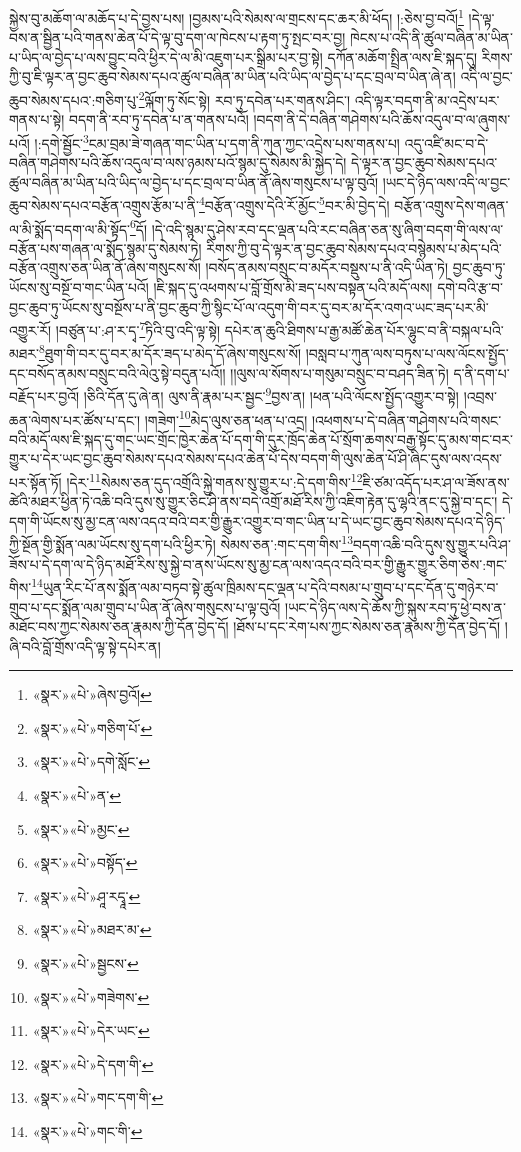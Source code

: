 སྐྱེས་བུ་མཆོག་ལ་མཆོད་པ་དེ་བྱས་པས། །བྱམས་པའི་སེམས་ལ་གྲངས་དང་ཆར་མི་ཕོད། །:ཅེས་བྱ་བའོ།\footnote{«སྣར་»«པེ་»ཞེས་བྱའོ།} །དེ་ལྟ་བས་ན་སྦྱིན་པའི་གནས་ཆེན་པོ་དེ་ལྟ་བུ་དག་ལ་ཁེངས་པ་རྟག་ཏུ་སྤང་བར་བྱ། ཁེངས་པ་འདི་ནི་ཚུལ་བཞིན་མ་ཡིན་པ་ཡིད་ལ་བྱེད་པ་ལས་བྱུང་བའི་ཕྱིར་དེ་ལ་མི་འཇུག་པར་སྒྲིམ་པར་བྱ་སྟེ། དཀོན་མཆོག་སྤྲིན་ལས་ཇི་སྐད་དུ། རིགས་ཀྱི་བུ་ཇི་ལྟར་ན་བྱང་ཆུབ་སེམས་དཔའ་ཚུལ་བཞིན་མ་ཡིན་པའི་ཡིད་ལ་བྱེད་པ་དང་བྲལ་བ་ཡིན་ཞེ་ན། འདི་ལ་བྱང་ཆུབ་སེམས་དཔའ་:གཅིག་པུ་\footnote{«སྣར་»«པེ་»གཅིག་པོ་}ལྐོག་ཏུ་སོང་སྟེ། རབ་ཏུ་དབེན་པར་གནས་ཤིང་། འདི་ལྟར་བདག་ནི་མ་འདྲེས་པར་གནས་པ་སྟེ། བདག་ནི་རབ་ཏུ་དབེན་པ་ན་གནས་པའོ། །བདག་ནི་དེ་བཞིན་གཤེགས་པའི་ཆོས་འདུལ་བ་ལ་ཞུགས་པའོ། །:དགེ་སྦྱོང་\footnote{«སྣར་»«པེ་»དགེ་སློང་}ངམ་བྲམ་ཟེ་གཞན་གང་ཡིན་པ་དག་ནི་ཀུན་ཀྱང་འདྲེས་པས་གནས་པ། འདུ་འཛི་མང་བ་དེ་བཞིན་གཤེགས་པའི་ཆོས་འདུལ་བ་ལས་ཉམས་པའོ་སྙམ་དུ་སེམས་མི་སྐྱེད་དེ། དེ་ལྟར་ན་བྱང་ཆུབ་སེམས་དཔའ་ཚུལ་བཞིན་མ་ཡིན་པའི་ཡིད་ལ་བྱེད་པ་དང་བྲལ་བ་ཡིན་ནོ་ཞེས་གསུངས་པ་ལྟ་བུའོ། །ཡང་དེ་ཉིད་ལས་འདི་ལ་བྱང་ཆུབ་སེམས་དཔའ་བརྩོན་འགྲུས་རྩོམ་པ་ནི་\footnote{«སྣར་»«པེ་»ན་}བརྩོན་འགྲུས་དེའི་རོ་མྱོང་\footnote{«སྣར་»«པེ་»མྱང་}བར་མི་བྱེད་དེ། བརྩོན་འགྲུས་དེས་གཞན་ལ་མི་སྨོད་བདག་ལ་མི་སྟོད་\footnote{«སྣར་»«པེ་»བསྟོད་}དོ། །དེ་འདི་སྙམ་དུ་ཤེས་རབ་དང་ལྡན་པའི་རང་བཞིན་ཅན་སུ་ཞིག་བདག་གི་ལས་ལ་བརྩོན་པས་གཞན་ལ་སྨོད་སྙམ་དུ་སེམས་ཏེ། རིགས་ཀྱི་བུ་དེ་ལྟར་ན་བྱང་ཆུབ་སེམས་དཔའ་བསྙེམས་པ་མེད་པའི་བརྩོན་འགྲུས་ཅན་ཡིན་ནོ་ཞེས་གསུངས་སོ། །བསོད་ནམས་བསྲུང་བ་མདོར་བསྡུས་པ་ནི་འདི་ཡིན་ཏེ། བྱང་ཆུབ་ཏུ་ཡོངས་སུ་བསྔོ་བ་གང་ཡིན་པའོ། །ཇི་སྐད་དུ་འཕགས་པ་བློ་གྲོས་མི་ཟད་པས་བསྟན་པའི་མདོ་ལས། དགེ་བའི་རྩ་བ་བྱང་ཆུབ་ཏུ་ཡོངས་སུ་བསྔོས་པ་ནི་བྱང་ཆུབ་ཀྱི་སྙིང་པོ་ལ་འདུག་གི་བར་དུ་བར་མ་དོར་འགའ་ཡང་ཟད་པར་མི་འགྱུར་རོ། །བཙུན་པ་:ཤ་ར་དྭ་\footnote{«སྣར་»«པེ་»ཤཱ་རདྭཱ་}ཏིའི་བུ་འདི་ལྟ་སྟེ། དཔེར་ན་ཆུའི་ཐིགས་པ་རྒྱ་མཚོ་ཆེན་པོར་ལྷུང་བ་ནི་བསྐལ་པའི་མཐར་\footnote{«སྣར་»«པེ་»མཐར་མ་}ཐུག་གི་བར་དུ་བར་མ་དོར་ཟད་པ་མེད་དོ་ཞེས་གསུངས་སོ། །བསླབ་པ་ཀུན་ལས་བཏུས་པ་ལས་ལོངས་སྤྱོད་དང་བསོད་ནམས་བསྲུང་བའི་ལེའུ་སྟེ་བདུན་པའོ།། །།ལུས་ལ་སོགས་པ་གསུམ་བསྲུང་བ་བཤད་ཟིན་ཏེ། ད་ནི་དག་པ་བརྗོད་པར་བྱའོ། །ཅིའི་དོན་དུ་ཞེ་ན། ལུས་ནི་རྣམ་པར་སྦྱང་\footnote{«སྣར་»«པེ་»སྦྱངས་}བྱས་ན། །ཕན་པའི་ལོངས་སྤྱོད་འགྱུར་བ་སྟེ། །འབྲས་ཆན་ལེགས་པར་ཚོས་པ་དང་། །གཟེག་\footnote{«སྣར་»«པེ་»གཟེགས་}མེད་ལུས་ཅན་ཕན་པ་འདྲ། །འཕགས་པ་དེ་བཞིན་གཤེགས་པའི་གསང་བའི་མདོ་ལས་ཇི་སྐད་དུ་གང་ཡང་གྲོང་ཁྱེར་ཆེན་པོ་དག་གི་དུར་ཁྲོད་ཆེན་པོ་སྲོག་ཆགས་བརྒྱ་སྟོང་དུ་མས་གང་བར་གྱུར་པ་དེར་ཡང་བྱང་ཆུབ་སེམས་དཔའ་སེམས་དཔའ་ཆེན་པོ་དེས་བདག་གི་ལུས་ཆེན་པོ་ཤི་ཞིང་དུས་ལས་འདས་པར་སྟོན་ཏོ། །དེར་\footnote{«སྣར་»«པེ་»དེར་ཡང་}སེམས་ཅན་དུད་འགྲོའི་སྐྱེ་གནས་སུ་གྱུར་པ་:དེ་དག་གིས་\footnote{«སྣར་»«པེ་»དེ་དག་གི་}ཇི་ཙམ་འདོད་པར་ཤ་ལ་ཟོས་ནས་ཚེའི་མཐར་ཕྱིན་ཏེ་འཆི་བའི་དུས་སུ་གྱུར་ཅིང་ཤི་ནས་བདེ་འགྲོ་མཐོ་རིས་ཀྱི་འཇིག་རྟེན་དུ་ལྷའི་ནང་དུ་སྐྱེ་བ་དང་། དེ་དག་གི་ཡོངས་སུ་མྱ་ངན་ལས་འདའ་བའི་བར་གྱི་རྒྱུར་འགྱུར་བ་གང་ཡིན་པ་དེ་ཡང་བྱང་ཆུབ་སེམས་དཔའ་དེ་ཉིད་ཀྱི་སྔོན་གྱི་སྨོན་ལམ་ཡོངས་སུ་དག་པའི་ཕྱིར་ཏེ། སེམས་ཅན་:གང་དག་གིས་\footnote{«སྣར་»«པེ་»གང་དག་གི་}བདག་འཆི་བའི་དུས་སུ་གྱུར་པའི་ཤ་ཟོས་པ་དེ་དག་ལ་དེ་ཉིད་མཐོ་རིས་སུ་སྐྱེ་བ་ནས་ཡོངས་སུ་མྱ་ངན་ལས་འདའ་བའི་བར་གྱི་རྒྱུར་གྱུར་ཅིག་ཅེས་:གང་གིས་\footnote{«སྣར་»«པེ་»གང་གི་}ཡུན་རིང་པོ་ནས་སྨོན་ལམ་བཏབ་སྟེ་ཚུལ་ཁྲིམས་དང་ལྡན་པ་དེའི་བསམ་པ་གྲུབ་པ་དང་དོན་དུ་གཉེར་བ་གྲུབ་པ་དང་སྨོན་ལམ་གྲུབ་པ་ཡིན་ནོ་ཞེས་གསུངས་པ་ལྟ་བུའོ། །ཡང་དེ་ཉིད་ལས་དེ་ཆོས་ཀྱི་སྐུས་རབ་ཏུ་ཕྱེ་བས་ན་མཐོང་བས་ཀྱང་སེམས་ཅན་རྣམས་ཀྱི་དོན་བྱེད་དོ། །ཐོས་པ་དང་རེག་པས་ཀྱང་སེམས་ཅན་རྣམས་ཀྱི་དོན་བྱེད་དོ། །ཞི་བའི་བློ་གྲོས་འདི་ལྟ་སྟེ་དཔེར་ན། 